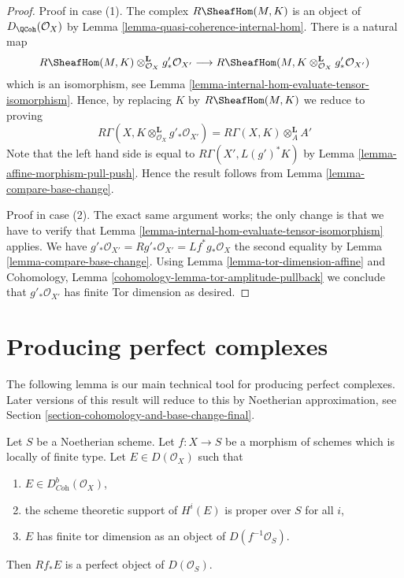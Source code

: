 \begin{proof}
Proof in case (1). The complex $R\SheafHom(M, K)$ is an object of
$D_\QCoh(\mathcal{O}_X)$ by Lemma \ref{lemma-quasi-coherence-internal-hom}.
There is a natural map
$$
R\SheafHom(M, K) \otimes_{\mathcal{O}_X}^\mathbf{L} g'_*\mathcal{O}_{X'}
\longrightarrow
R\SheafHom(M, K \otimes_{\mathcal{O}_X}^\mathbf{L} g'_*\mathcal{O}_{X'})
$$
which is an isomorphism, see
Lemma \ref{lemma-internal-hom-evaluate-tensor-isomorphism}.
Hence, by replacing $K$ by $R\SheafHom(M, K)$ we reduce to proving
$$
R\Gamma(X, K \otimes^\mathbf{L}_{\mathcal{O}_X} g'_*\mathcal{O}_{X'})
= R\Gamma(X, K) \otimes^\mathbf{L}_A A'
$$
Note that the left hand side is equal to $R\Gamma(X', L(g')^*K)$
by Lemma \ref{lemma-affine-morphism-pull-push}.
Hence the result follows from
Lemma \ref{lemma-compare-base-change}.

\medskip\noindent
Proof in case (2). The exact same argument works; the only change is that
we have to verify that
Lemma \ref{lemma-internal-hom-evaluate-tensor-isomorphism} applies.
We have $g'_*\mathcal{O}_{X'} = Rg'_*\mathcal{O}_{X'} =
Lf^*g_*\mathcal{O}_X$ the second equality by
Lemma \ref{lemma-compare-base-change}.
Using Lemma \ref{lemma-tor-dimension-affine} and
Cohomology, Lemma \ref{cohomology-lemma-tor-amplitude-pullback}
we conclude that $g'_*\mathcal{O}_{X'}$ has finite Tor dimension
as desired.
\end{proof}



\section{Producing perfect complexes}
\label{section-producing-perfect}

\noindent
The following lemma is our main technical tool for producing
perfect complexes. Later versions of this result will reduce to
this by Noetherian approximation, see
Section \ref{section-cohomology-and-base-change-final}.

\begin{lemma}
\label{lemma-perfect-direct-image}
Let $S$ be a Noetherian scheme. Let $f : X \to S$ be a morphism of schemes
which is locally of finite type. Let $E \in D(\mathcal{O}_X)$ such that
\begin{enumerate}
\item $E \in D^b_{\textit{Coh}}(\mathcal{O}_X)$,
\item the scheme theoretic support of $H^i(E)$ is proper over $S$ for all $i$,
\item $E$ has finite tor dimension as an object of $D(f^{-1}\mathcal{O}_S)$.
\end{enumerate}
Then $Rf_*E$ is a perfect object of $D(\mathcal{O}_S)$.
\end{lemma}

